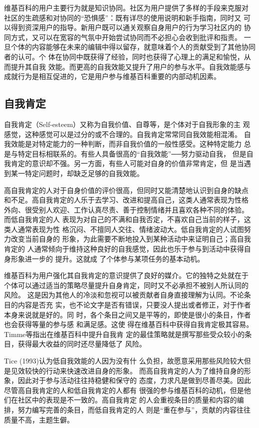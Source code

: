 维基百科的用户主要行为就是知识协同。社区为用户提供了多样的手段来克服对
社区的生疏感和对协同的“恐惧感”：既有详尽的使用说明和新手指南，同时又
可以得到资深用户的指导。新用户既可以通关观察自身用户的行为学习社区内的
协同方式，又可以在宽容的气氛中开始尝试协同而不必担心会收到批评和指责。
一旦个体的内容能够在未来的编辑中得以留存，就意味着个人的贡献受到了其他协同者的认可。个
体在协同中既获得了经验，同时也获得了心理上的满足和愉悦，从而提升其自我
效能。而更高的自我效能又提升了用户的参与水平。自我效能感与成就行为是相互促进的，它是用户参与维基百科重要的内部动机因素。

\subsection{自我肯定}
\label{sec:self-esteem}

自我肯定（Self-esteem）又称为自我价值、自尊等，是个体对于自我形象的主
观感觉，这种感觉可以是过分的或不合理的。自我肯定常常同自我效能相混淆。
自我效能是对特定能力的一种判断，而非自我价值的一般性感受。这种特定能力
总是与特定目标相联系的。有些人具备很高的“自我效能”──努力驱动自我，
但是自我肯定的意识却不强。另一方面，有些人可能对自身的价值非常肯定，但
是当遇到某一特定问题时，却缺乏足够的自我效能。

高自我肯定的人对于自身价值的评价很高，但同时又能清楚地认识到自身的缺点
和不足。高自我肯定的人乐于去学习、改进和提高自己，这类人通常表现为性格
外向、很受别人欢迎、工作认真尽责、善于控制情绪并且喜欢各种不同的体验。
而低自我肯定的人
表现为对自己的不满和自我否定，不喜欢自己当前的样子，这类人通常表现为性
格沉闷、不擅同人交往、情绪波动大。低自我肯定的人试图努力改变当前自身的
形象，为此需要不断地投入到某种活动中来证明自己；高自我肯定的
人通常倾向于维持这种良好的自我感觉，因此也乐于参与到活动中获得自身形象进一步的
提升。这就成
了个体参与某项任务的基本动机。

维基百科为用户强化其自我肯定的意识提供了良好的媒介。它的独特之处就在于
个体可以通过适当的策略尽量提升自身肯定，同时又不必承担不被别人所认同的
风险。
这是因为其他人的冷淡和忽视可以被贡献者自身直接理解为认同。不论条目的内容是否充
实，也不论文字是否有错误，只要没人提出或者修正，对于作者本身来说就是好的。同
时，各个条目之间又是平等的，即使是很小的条目，作者也会获得等量的参与感
和满足感。这使
得在维基百科中获得自我肯定极其容易。Timme等指出在维基百科中提升自我肯
定的最佳策略就是撰写那些受众较小的条目，获得最大收益的同时还尽量降低了
风险。

Tice (1993)认为低自我效能的人因为没有什
么负担，故愿意采用那些风险较大但是见效较快的行动来快速改进自身的形象。
而高自我肯定的人为了维持自身的形象，因此对于参与活动往往持稳健和保守的
态度，力求凡是做到尽善尽美。因此尽管高自我肯定的人和低自我肯定的人都有
很强的参与维基百科的动机，但是他们在社区中的表现是不一致的。高自我肯定
的人会重视条目的质量和内容的编排，努力编写完善的条目，而低自我肯定的人
则是“重在参与”，贡献的内容往往质量不高，主题生僻。

